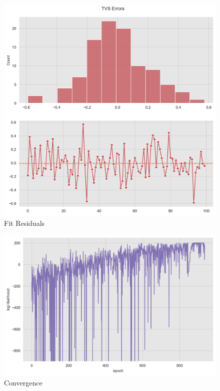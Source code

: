 \documentclass[11pt]{amsart}
\theoremstyle{definition}
\begin{document}
\begin{center}
\begin{figure}
\includegraphics[scale=0.5]{images/tvs_errors.png}
\caption{Fit Residuals}
\label{fig:tvs_errors}
\end{figure}
\end{center}

\begin{center}
\begin{figure}
\includegraphics[scale=0.6]{images/convergence.png} 
\caption{Convergence}
\label{fig:convergence}
\end{figure}
\end{center}
\end{document}
